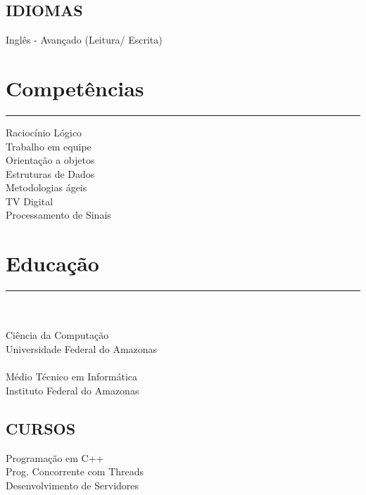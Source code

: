 \documentclass[]{rahulworld-resume}
\begin{document}
\begin{minipage}[t]{0.33\textwidth}
\subsection{IDIOMAS}
Inglês - Avançado (Leitura/ Escrita)
\sectionsep
\section{Competências}
\noindent\rule{5cm}{0.4pt}

Raciocínio Lógico\\
Trabalho em equipe\\
Orientação a objetos\\
Estruturas de Dados\\
Metodologias ágeis\\
TV Digital\\
Processamento de Sinais
\sectionsep
\section{Educação} 
\noindent\rule{5cm}{0.4pt}\\
\\
Ciência da Computação\\
Universidade Federal do Amazonas \\
\vspace{8pt}
\\
Médio Técnico em Informática\\
Instituto Federal do Amazonas\\
\vspace{8pt}
\subsection{CURSOS}
Programação em C++\\
Prog. Concorrente com Threads\\
Desenvolvimento de Servidores
\sectionsep
%
%

\end{minipage} 
\hfill
\end{document}
